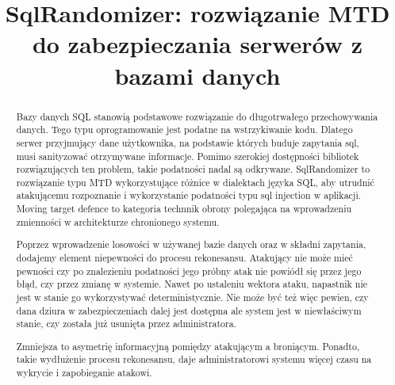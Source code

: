 \documentclass[conference]{IEEEtran}
\begin{document}
\title{SqlRandomizer: rozwiązanie MTD do zabezpieczania serwerów z bazami danych}

\author{
    \and
    }

\maketitle

\begin{abstract}
    Bazy danych SQL stanowią podstawowe rozwiązanie do długotrwałego przechowywania danych.
    Tego typu oprogramowanie jest podatne na wstrzykiwanie kodu.
    Dlatego serwer przyjmujący dane użytkownika, na podstawie których buduje zapytania sql, musi sanityzować otrzymywane informacje.
    Pomimo szerokiej dostępności bibliotek rozwiązujących ten problem, takie podatności nadal są odkrywane.
    SqlRandomizer to rozwiązanie typu MTD wykorzystujące różnice w dialektach języka SQL, aby utrudnić atakującemu rozpoznanie i wykorzystanie podatności typu sql injection w aplikacji.
    Moving target defence to kategoria technnik obrony polegająca na wprowadzeniu zmienności w architekturze chronionego systemu.

    Poprzez wprowadzenie losowości w używanej bazie danych oraz w składni zapytania, dodajemy element niepewności do procesu rekonesansu.
    Atakujący nie może mieć pewności czy po znalezieniu podatności jego próbny atak nie powiódł się przez jego błąd, czy przez zmianę w systemie.
    Nawet po ustaleniu wektora ataku, napastnik nie jest w stanie go wykorzystywać deterministycznie.
    Nie może być też więc pewien, czy dana dziura w zabezpieczeniach dalej jest dostępna ale system jest w niewłaściwym stanie, czy została już usunięta przez administratora.

    Zmniejsza to asymetrię informacyjną pomiędzy atakującym a broniącym.
    Ponadto, takie wydłużenie procesu rekonesansu, daje administratorowi systemu więcej czasu na wykrycie i zapobieganie atakowi.

\end{abstract}
\end{document}
